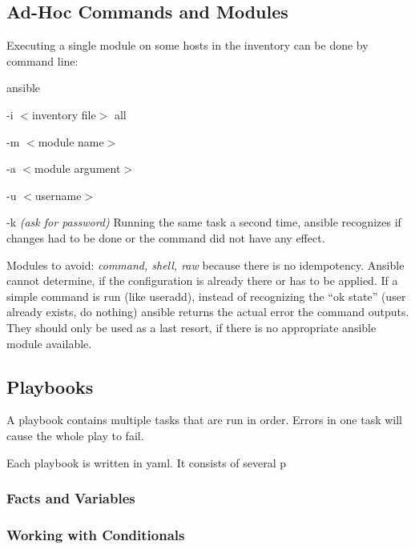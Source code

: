 \subsection{Ad-Hoc Commands and Modules}
Executing a single module on some hosts in the inventory can be done by command line: 

\ttfamily
\noindent
ansible 

-i $<$inventory file$>$ all 

-m $<$module name$>$ 

-a $<$module argument$>$ 

-u $<$username$>$ 

-k \rmfamily \emph{(ask for password)}
Running the same task a second time, ansible recognizes if changes had to be done or the command did not have any effect.

Modules to avoid: \emph{command, shell, raw} because there is no idempotency. Ansible cannot determine, if the configuration is already there or has to be applied. If a simple command is run (like useradd), 
instead of recognizing the ``ok state'' (user already exists, do nothing) ansible returns the actual error the command outputs. 
They should only be used as a last resort, if there is no appropriate ansible module available.

\subsection{Playbooks}
A playbook contains multiple tasks that are run in order. Errors in one task will cause the whole play to fail.

Each playbook is  written in yaml. It consists of several p

\subsubsection{Facts and Variables}

\subsubsection{Working with Conditionals}